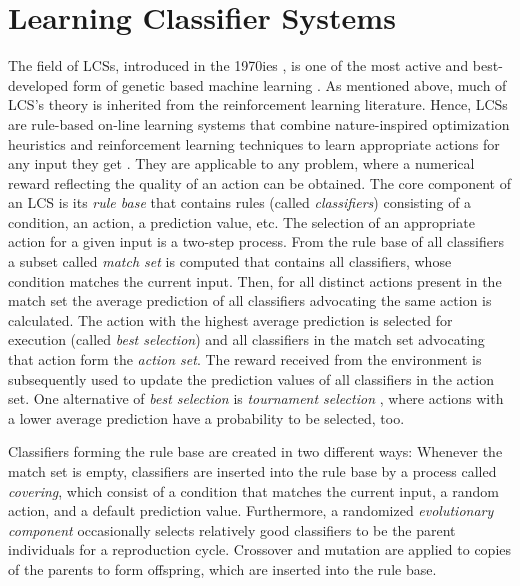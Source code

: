 \section{Learning Classifier Systems}
\label{section:learning-classifier-systems}

The field of LCSs, introduced in the 1970ies \cite{Hol75,Hol76,HR78}, is one of the most active and best-developed form of genetic based machine learning \cite{Kov02a,KL00,Lan08}. As mentioned above, much of LCS's theory is inherited from the reinforcement learning literature. %
Hence, LCSs are rule-based on-line learning systems that combine nature-inspired optimization heuristics and reinforcement learning techniques to learn appropriate actions for any input they get \cite{Wil95}. They are applicable to any problem, where a numerical reward reflecting the quality of an action can be obtained. The core component of an LCS is its \emph{rule base} that contains rules (called \emph{classifiers}) consisting of a condition, an action, a prediction value, etc. The selection of an appropriate action for a given input is a two-step process. From the rule base of all classifiers a subset called \emph{match set} is computed that contains all classifiers, whose condition matches the current input. Then, for all distinct actions present in the match set the average prediction of all classifiers advocating the same action is calculated. The action with the highest average prediction is selected for execution (called \emph{best selection}) and all classifiers in the match set advocating that action form the \emph{action set}. The reward received from the environment is subsequently used to update the prediction values of all classifiers in the action set. One alternative of \emph{best selection} is \emph{tournament selection} \cite{Butz2003}, where actions with a lower average prediction have a probability to be selected, too. 

Classifiers forming the rule base are created in two different ways: Whenever the match set is empty, classifiers are inserted into the rule base by a process called \emph{covering}, which consist of a condition that matches the current input, a random action, and a default prediction value. Furthermore, a randomized \emph{evolutionary component} occasionally selects relatively good classifiers to be the parent individuals for a reproduction cycle. Crossover and mutation are applied to copies of the parents to form offspring, which are inserted into the rule base. 


